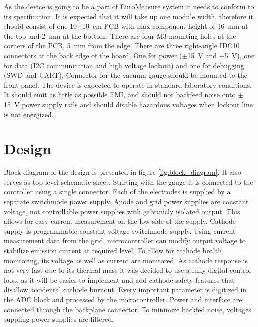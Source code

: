 \documentclass{article}
\begin{document}
As the device is going to be a part of EuroMeasure system it needs to conform to its specification.
It is expected that it will take up one module width, therefore it should consist of one \num{10}$\times$\SI{10}{\centi\meter} PCB with max
component height of \SI{16}{\milli\meter} at the top and \SI{2}{\milli\meter} at the bottom. There are four M3 mounting holes at the corners of the PCB, \SI{5}{\milli\meter} from the edge.
There are three right-angle IDC10 connectors at the back edge of the board. One for power ($\pm$\SI{15}{\volt} and $+$\SI{5}{\volt}), one for data (I2C communication and high voltage lockout) and one for debugging (SWD and UART).
Connector for the vacuum gauge should be mounted to the front panel. The device is expected to operate in standard laboratory conditions.
It should emit as little as possible EMI, and should not backfeed noise onto $\pm$\SI{15}{\volt} power supply rails and should disable hazardous voltages when lockout line is not energized.

\section{Design}

Block diagram of the design is presented in figure \ref{fig:block_diagram}. It also serves as top level schematic sheet.
Starting with the gauge it is connected to the controller using a single connector. Each of the electrodes is supplied by a separate switchmode power supply.
Anode and grid power supplies are constant voltage, not controllable power supplies with galvanicly isolated output. This allows for easy current measurement on the low side of the supply.
Cathode supply is programmable constant voltage switchmode supply. Using current measurement data from the grid, microcontroller can modify output voltage to stabilize emission current at required level.
To allow for cathode health monitoring, its voltage as well as current are monitored.
As cathode response is not very fast due to its thermal mass it was decided to use a fully digital control loop, as it will be easier to implement and add cathode safety features that disallow accidental cathode burnout.
Every important parameter is digitized in the ADC block and processed by the microcontroller. Power and interface are connected through the backplane connector.
To minimize backfed noise, voltages suppling power supplies are filtered.
\end{document}
